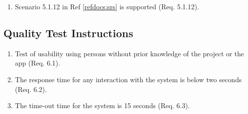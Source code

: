 \documentclass[a4paper]{article}
\newlength{\testlabellength}
\newenvironment{testlist}{\begin{enumerate}[label=\bfseries Instruction \thesubsection.\arabic* , labelindent=0pt, labelwidth=\testlabellength , leftmargin=2cm]}{\end{enumerate}}
\begin{document}
\begin{appendices}
\begin{testlist}
	\item Scenario 5.1.12 in Ref \ref{refdocs:srs} is supported (Req. 5.1.12).
\end{testlist}

\subsection{Quality Test Instructions}

\begin{testlist}
	\item Test of usability using persons without prior knowledge of the project or the app (Req. 6.1).
	
	\item The response time for any interaction with the system is below two seconds (Req. 6.2).
	
	\item The time-out time for the system is 15 seconds (Req. 6.3). 
	
\end{testlist}

\clearpage

\end{appendices}
\end{document}
